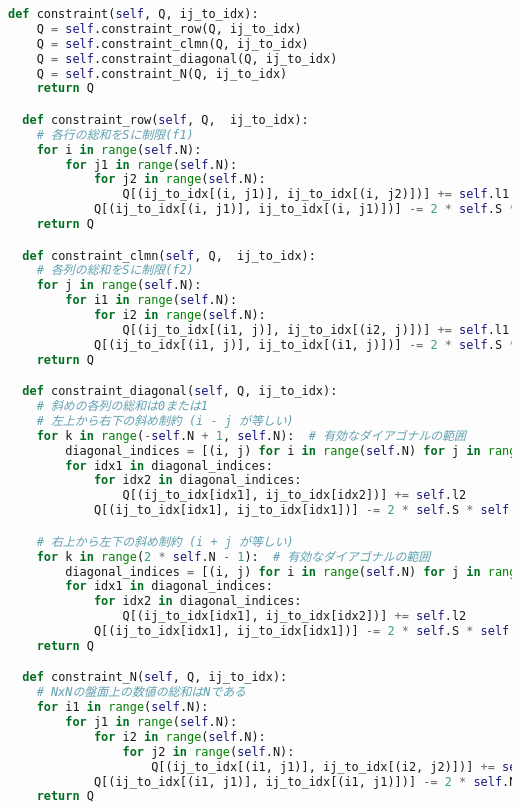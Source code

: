 \documentclass[uplatex,dvipdfmx,a4paper,11pt,oneside,openany]{jsbook}
\begin{document}
\begin{lstlisting}[language=Python]
  def constraint(self, Q, ij_to_idx):
    Q = self.constraint_row(Q, ij_to_idx)
    Q = self.constraint_clmn(Q, ij_to_idx)
    Q = self.constraint_diagonal(Q, ij_to_idx)
    Q = self.constraint_N(Q, ij_to_idx)
    return Q

  def constraint_row(self, Q,  ij_to_idx):
    # 各行の総和をSに制限(f1)
    for i in range(self.N):
        for j1 in range(self.N):
            for j2 in range(self.N):
                Q[(ij_to_idx[(i, j1)], ij_to_idx[(i, j2)])] += self.l1
            Q[(ij_to_idx[(i, j1)], ij_to_idx[(i, j1)])] -= 2 * self.S * self.l1
    return Q

  def constraint_clmn(self, Q,  ij_to_idx):
    # 各列の総和をSに制限(f2)
    for j in range(self.N):
        for i1 in range(self.N):
            for i2 in range(self.N):
                Q[(ij_to_idx[(i1, j)], ij_to_idx[(i2, j)])] += self.l1
            Q[(ij_to_idx[(i1, j)], ij_to_idx[(i1, j)])] -= 2 * self.S * self.l1
    return Q

  def constraint_diagonal(self, Q, ij_to_idx):
    # 斜めの各列の総和は0または1
    # 左上から右下の斜め制約 (i - j が等しい)
    for k in range(-self.N + 1, self.N):  # 有効なダイアゴナルの範囲
        diagonal_indices = [(i, j) for i in range(self.N) for j in range(self.N) if i - j == k]
        for idx1 in diagonal_indices:
            for idx2 in diagonal_indices:
                Q[(ij_to_idx[idx1], ij_to_idx[idx2])] += self.l2
            Q[(ij_to_idx[idx1], ij_to_idx[idx1])] -= 2 * self.S * self.l2

    # 右上から左下の斜め制約 (i + j が等しい)
    for k in range(2 * self.N - 1):  # 有効なダイアゴナルの範囲
        diagonal_indices = [(i, j) for i in range(self.N) for j in range(self.N) if i + j == k]
        for idx1 in diagonal_indices:
            for idx2 in diagonal_indices:
                Q[(ij_to_idx[idx1], ij_to_idx[idx2])] += self.l2
            Q[(ij_to_idx[idx1], ij_to_idx[idx1])] -= 2 * self.S * self.l2
    return Q

  def constraint_N(self, Q, ij_to_idx):
    # NxNの盤面上の数値の総和はNである
    for i1 in range(self.N):
        for j1 in range(self.N):
            for i2 in range(self.N):
                for j2 in range(self.N):
                    Q[(ij_to_idx[(i1, j1)], ij_to_idx[(i2, j2)])] += self.l3
            Q[(ij_to_idx[(i1, j1)], ij_to_idx[(i1, j1)])] -= 2 * self.N * self.l3
    return Q

\end{lstlisting}
\end{document}
